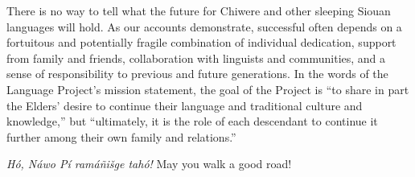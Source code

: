 \documentclass[output=paper]{LSP/langsci}
\begin{document}
There is no way to tell what the future for Chiwere and other sleeping Siouan languages will hold. As our accounts demonstrate, successful  often depends on a fortuitous and potentially fragile combination of individual dedication, support from family and friends, collaboration with linguists and communities, and a sense of responsibility to previous and future generations. In the words of the  Language Project's mission statement, the goal of the Project is ``to share in part the Elders' desire to continue their language and traditional culture and knowledge,'' but ``ultimately, it is the role of each descendant to continue it further among their own family and relations.''

\emph{Hó, Náwo Pí ramáñišge tahó!}  May you walk a good road!

\newpage
{\sloppy
\printbibliography[heading=subbibliography,notkeyword=this]
}
\end{document}
